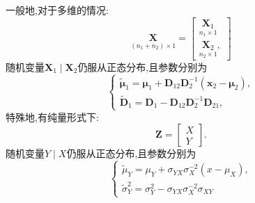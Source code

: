 \documentclass[cn,10pt,citestyle=gb7714-2015,bibstyle=gb7714-2015]{elegantbook}
\begin{document}
  \begin{theorem}[正态分布的条件概率的分布]\label{thm:conditional-PDF}
    一般地,对于多维的情况:
    \[
      \underset{(n_1+n_2)\times 1}{\bm{X}}=\begin{bmatrix}
        \underset{n_1\times 1}{\bm{X}_1}\\
        \underset{n_2\times 1}{\bm{X}_2},
      \end{bmatrix}
  \]
  随机变量$\bm{X}_1\mid\bm{X}_2$仍服从正态分布,且参数分别为
  \begin{equation}
    \begin{cases}
      \widetilde{\bm{\mu}}_1=\bm{\mu}_1+\bm{D}_{12}\bm{D}_2^{-1}(\bm{x}_2-\bm{\mu}_2),\\
      \widetilde{\bm{D}}_1=\bm{D}_1-\bm{D}_{12}\bm{D}_2^{-1}\bm{D}_{21},
    \end{cases}
  \end{equation}
  特殊地,有纯量形式下:
  \[
      \bm{Z}=\begin{bmatrix}
        X\\
        Y
      \end{bmatrix}.
  \]
  随机变量$Y\mid X$仍服从正态分布,且参数分别为
  \begin{equation}
    \begin{cases}
      \widetilde{\mu}_Y=\mu_Y+\sigma_{YX}\sigma_{X}^{-2}(x-\mu_X),\\
      \widetilde{\sigma}_Y^2=\sigma_Y^2-\sigma_{YX}\sigma_{X}^{-2}\sigma_{XY}
    \end{cases}
  \end{equation}
  \end{theorem}
\end{document}
